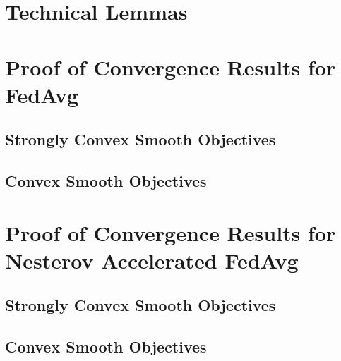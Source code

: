 


%

\section{Technical Lemmas}



\section{Proof of Convergence Results for FedAvg}
\label{sec:app:fedavg}

\subsection{Strongly Convex Smooth Objectives}


\subsection{Convex Smooth Objectives}
\label{sec:nasgdscvxsmth}
%


\section{Proof of Convergence Results for Nesterov Accelerated FedAvg}
\label{sec:app:Nesterovfedavg}
\subsection{Strongly Convex Smooth Objectives}
\label{sec:convexsmoothsgd}
%


\subsection{Convex Smooth Objectives}
\label{sec:nasgdcvxsmth}
%


%

